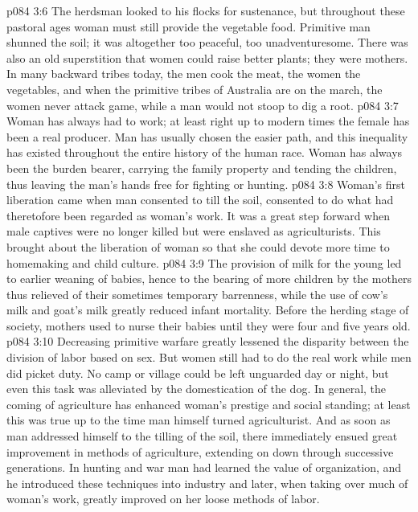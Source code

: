 \vs p084 3:6 \pc The herdsman looked to his flocks for sustenance, but throughout these pastoral ages woman must still provide the vegetable food. Primitive man shunned the soil; it was altogether too peaceful, too unadventuresome. There was also an old superstition that women could raise better plants; they were mothers. In many backward tribes today, the men cook the meat, the women the vegetables, and when the primitive tribes of Australia are on the march, the women never attack game, while a man would not stoop to dig a root.
\vs p084 3:7 Woman has always had to work; at least right up to modern times the female has been a real producer. Man has usually chosen the easier path, and this inequality has existed throughout the entire history of the human race. Woman has always been the burden bearer, carrying the family property and tending the children, thus leaving the man’s hands free for fighting or hunting.
\vs p084 3:8 Woman’s first liberation came when man consented to till the soil, consented to do what had theretofore been regarded as woman’s work. It was a great step forward when male captives were no longer killed but were enslaved as agriculturists. This brought about the liberation of woman so that she could devote more time to homemaking and child culture.
\vs p084 3:9 The provision of milk for the young led to earlier weaning of babies, hence to the bearing of more children by the mothers thus relieved of their sometimes temporary barrenness, while the use of cow’s milk and goat’s milk greatly reduced infant mortality. Before the herding stage of society, mothers used to nurse their babies until they were four and five years old.
\vs p084 3:10 Decreasing primitive warfare greatly lessened the disparity between the division of labor based on sex. But women still had to do the real work while men did picket duty. No camp or village could be left unguarded day or night, but even this task was alleviated by the domestication of the dog. In general, the coming of agriculture has enhanced woman’s prestige and social standing; at least this was true up to the time man himself turned agriculturist. And as soon as man addressed himself to the tilling of the soil, there immediately ensued great improvement in methods of agriculture, extending on down through successive generations. In hunting and war man had learned the value of organization, and he introduced these techniques into industry and later, when taking over much of woman’s work, greatly improved on her loose methods of labor.
